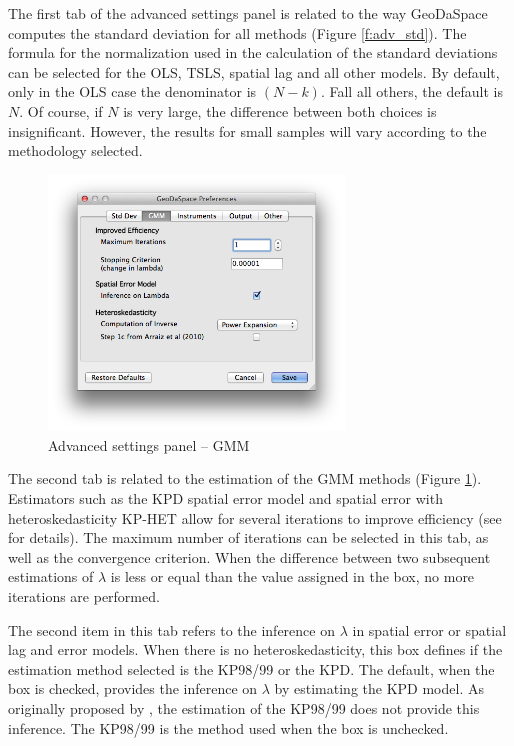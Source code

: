 \documentclass{article}
\begin{document}
The first tab of the advanced settings panel is related to the way GeoDaSpace computes the standard deviation for all methods (Figure \ref{f:adv_std}). The formula for the normalization used in the calculation of the standard deviations can be selected for the OLS, TSLS, spatial lag and all other models. By default, only in the OLS case the denominator is $(N-k)$. Fall all others, the default is $N$. Of course, if $N$ is very large, the difference between both choices is insignificant. However, the results for small samples will vary according to the methodology selected.
\FloatBarrier

\begin{figure}[htb]
\centering
\caption{Advanced settings panel -- GMM}
\label{f:adv_gmm}
\includegraphics[width=0.7\textwidth]{adv_gmm.png}
\end{figure}

The second tab is related to the estimation of the GMM methods (Figure \ref{f:adv_gmm}). Estimators such as the KPD spatial error model \citep{Drukker10} and spatial error with heteroskedasticity KP-HET \citep{Arraiz10} allow for several iterations to improve efficiency (see \citet{Anselin11} for details). The maximum number of iterations can be selected in this tab, as well as the convergence criterion. When the difference between two subsequent estimations of $\lambda$ is less or equal than the value assigned in the box, no more iterations are performed. 

The second item in this tab refers to the inference on $\lambda$ in spatial error or spatial lag and error models. When there is no heteroskedasticity, this box defines if the estimation method selected is the KP98/99 or the KPD. The default, when the box is checked, provides the inference on $\lambda$ by estimating the KPD model. As originally proposed by \citet{Kelejian98,Kelejian99}, the estimation of the KP98/99 does not provide this inference. The KP98/99 is the method used when the box is unchecked.
\end{document}
